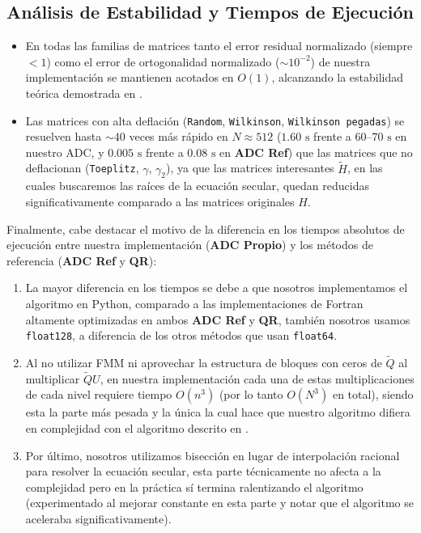 \documentclass[11pt,a4paper]{article}
\begin{document}
\newpage

\subsection{Análisis de Estabilidad y Tiempos de Ejecución}

\begin{calloutbox}
    \begin{itemize}
        \item En todas las familias de matrices tanto el error residual normalizado (siempre $< 1$) como el error de ortogonalidad normalizado ($\sim 10^{-2}$) de nuestra implementación se mantienen acotados en $O(1)$, alcanzando la estabilidad teórica demostrada en \cite{gu1995}.
        \item Las matrices con alta deflación (\texttt{Random}, \texttt{Wilkinson}, \texttt{Wilkinson pegadas}) se resuelven hasta $\sim 40$ veces más rápido en $N \approx 512$ ($1.60\text{ s}$ frente a $60\text{--}70\text{ s}$ en nuestro ADC, y $0.005\text{ s}$ frente a $0.08\text{ s}$ en \textbf{ADC Ref}) que las matrices que no deflacionan (\texttt{Toeplitz}, $\gamma$, $\gamma_2$), ya que las matrices interesantes $\tilde{H}$, en las cuales buscaremos las raíces de la ecuación secular, quedan reducidas significativamente comparado a las matrices originales $H$.
    \end{itemize}
\end{calloutbox}

Finalmente, cabe destacar el motivo de la diferencia en los tiempos absolutos de ejecución entre nuestra implementación (\textbf{ADC Propio}) y los métodos de referencia (\textbf{ADC Ref} y \textbf{QR}):
\begin{enumerate}
	\item La mayor diferencia en los tiempos se debe a que nosotros implementamos el algoritmo en Python, comparado a las implementaciones de Fortran altamente optimizadas en ambos \textbf{ADC Ref} y \textbf{QR}, también nosotros usamos \texttt{float128}, a diferencia de los otros métodos que usan \texttt{float64}.
	
	\item Al no utilizar FMM ni aprovechar la estructura de bloques con ceros de $\tilde{Q}$ al multiplicar $\tilde{Q}U$, en nuestra implementación cada una de estas multiplicaciones de cada nivel requiere tiempo $O(n^3)$ (por lo tanto $O(N^3)$ en total), siendo esta la parte más pesada y la única la cual hace que nuestro algoritmo difiera en complejidad con el algoritmo descrito en  \cite{gu1995}.
    
    \item Por último, nosotros utilizamos bisección en lugar de interpolación racional para resolver la ecuación secular, esta parte técnicamente no afecta a la complejidad pero en la práctica sí termina ralentizando el algoritmo (experimentado al mejorar constante en esta parte y notar que el algoritmo se aceleraba significativamente).

\end{enumerate}
\end{document}
